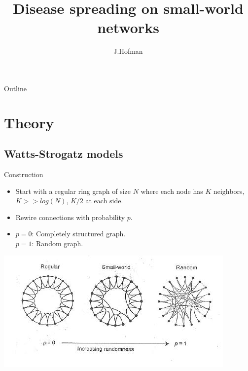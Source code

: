 \documentclass[blackandwhite]{beamer}
\title
{Disease spreading on small-world networks}
\author
{J.Hofman}
\institute
{
 Department of Computational Science\\
 University of Amsterdam}
\begin{document}
\begin{frame}
  \titlepage
\end{frame}

\begin{frame}{Outline}
  \tableofcontents
\end{frame}


\section{Theory}

\subsection{Watts-Strogatz models}

\begin{frame}{Construction}
	\begin{itemize}
	\item
	Start with a regular ring graph of size $N$ where each node has $K$ neighbors, $K >> log(N)$, $K/2$ at each side.
	\item
	Rewire connections with probability $p$.
	\item
	$p = 0$: Completely structured graph.\\
	$p = 1$: Random graph.
	\end{itemize}
	\begin{center}
	\includegraphics[scale=0.5]{smallworld.jpg}
	\end{center}
\end{frame}
\end{document}
